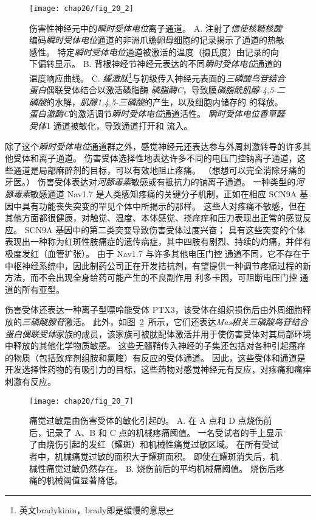\begin{figure}[htbp]
	\centering
	\texttt{[image: chap20/fig\_20\_2]}
	\caption{伤害性神经元中的\textit{瞬时受体电位}离子通道。
		A. 注射了\textit{信使核糖核酸}编码\textit{瞬时受体电位}通道的非洲爪蟾卵母细胞的记录揭示了通道的热敏感性。
		特定\textit{瞬时受体电位}通道被激活的温度（摄氏度）由记录的向下偏转显示\cite{tominaga2004thermosensation}。
		B. 背根神经节神经元表达的不同\textit{瞬时受体电位}通道的温度响应曲线\cite{jordt2003lessons}。
		C. \textit{缓激肽}\footnote{英文bradykinin，brady即是缓慢的意思}与初级传入神经元表面的\textit{三磷酸鸟苷结合蛋白}偶联受体结合以激活磷脂酶 \textit{磷脂酶C}，导致膜\textit{磷脂酰肌醇-4,5-二磷酸}的水解，\textit{肌醇1,4,5-三磷酸}的产生，以及细胞内储存的  的释放。
		\textit{蛋白激酶C}的激活调节\textit{瞬时受体电位}通道活性。 
		\textit{瞬时受体电位香草醛受体}1 通道被敏化，导致通道打开和  流入\cite{bautista2006trpa1}。}
	\label{fig:20_2}
\end{figure}


除了这个\textit{瞬时受体电位}通道群之外，感觉神经元还表达参与外周刺激转导的许多其他受体和离子通道。
伤害受体选择性地表达许多不同的电压门控钠离子通道，这些通道是局部麻醉剂的目标，可以有效地阻止疼痛。
（想想可以完全消除牙痛的牙医。）
伤害受体表达对\textit{河豚毒素}敏感或有抵抗力的钠离子通道。
一种类型的\textit{河豚毒素}敏感通道 Nav1.7 是人类感知疼痛的关键分子机制，正如在相应 SCN9A 基因中具有功能丧失突变的罕见个体中所揭示的那样。
这些人对疼痛不敏感，但在其他方面都很健康，对触觉、温度、本体感觉、挠痒痒和压力表现出正常的感觉反应。 
SCN9A 基因中的第二类突变导致伤害受体过度兴奋； 具有这些突变的个体表现出一种称为红斑性肢痛症的遗传病症，其中四肢有剧烈、持续的灼痛，并伴有极度发红（血管扩张）。
由于 Nav1.7 与许多其他电压门控  通道不同，它不存在于中枢神经系统中，因此制药公司正在开发拮抗剂，有望提供一种调节疼痛过程的新方法，而不会出现全身给药可能产生的不良副作用 利多卡因，可阻断电压门控  通道的所有亚型。


伤害受体还表达一种离子型嘌呤能受体 PTX3，该受体在组织损伤后由外周细胞释放的\textit{三磷酸腺苷}激活。
此外，如图~\ref{fig:20_7}~所示，它们还表达\textit{Mas相关三磷酸鸟苷结合蛋白偶联受体}家族的成员，该家族可被肽配体激活并用于使伤害受体对其局部环境中释放的其他化学物质敏感。
这些无髓鞘传入神经的子集还包括对各种引起瘙痒的物质（包括致痒剂组胺和氯喹）有反应的受体通道。
因此，这些受体和通道是开发选择性药物的有吸引力的目标，这些药物对感觉神经元有反应，对疼痛和瘙痒刺激有反应。


\begin{figure}[htbp]
	\centering
	\texttt{[image: chap20/fig\_20\_7]}
	\caption{痛觉过敏是由伤害受体的敏化引起的\cite{raja1984evidence}。
		A. 在 A 点和 D 点烧伤前后，记录了 A、B 和 C 点的机械疼痛阈值。
		一名受试者的手上显示了由烧伤引起的发红（耀斑）和机械性痛觉过敏区域。
		在所有受试者中，机械痛觉过敏的面积大于耀斑面积。
		即使在耀斑消失后，机械性痛觉过敏仍然存在。
		B. 烧伤前后的平均机械痛阈值。
		烧伤后疼痛的机械阈值显著降低。}
	\label{fig:20_7}
\end{figure}


